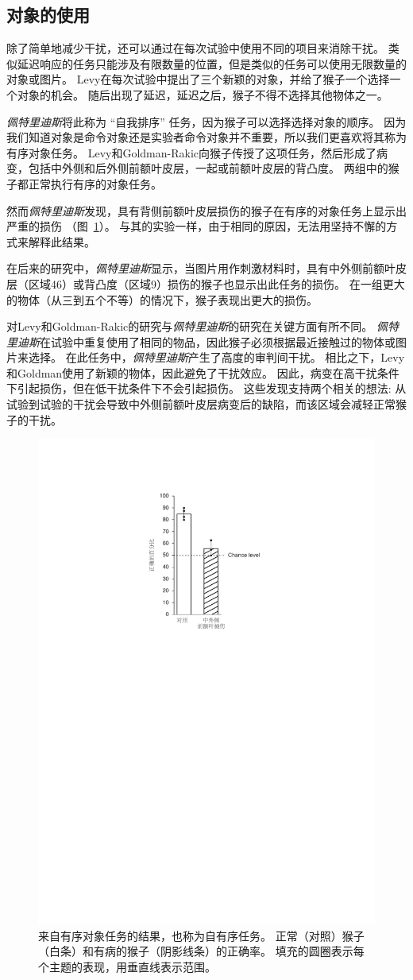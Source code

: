 \subsection{对象的使用}

除了简单地减少干扰，还可以通过在每次试验中使用不同的项目来消除干扰。
类似延迟响应的任务只能涉及有限数量的位置，但是类似的任务可以使用无限数量的对象或图片。
Levy\cite{levy1999association}在每次试验中提出了三个新颖的对象，并给了猴子一个选择一个对象的机会。
随后出现了延迟，延迟之后，猴子不得不选择其他物体之一。


\textit{佩特里迪斯}\cite{petrides1995impairments}将此称为 “自我排序” 任务，因为猴子可以选择选择对象的顺序。
因为我们知道对象是命令对象还是实验者命令对象并不重要，所以我们更喜欢将其称为有序对象任务。
Levy和Goldman-Rakic向猴子传授了这项任务，然后形成了病变，包括中外侧和后外侧前额叶皮层，一起或前额叶皮层的背凸度。
两组中的猴子都正常执行有序的对象任务。


然而\textit{佩特里迪斯}\cite{petrides1995impairments}发现，具有背侧前额叶皮层损伤的猴子在有序的对象任务上显示出严重的损伤 （图~\ref{fig:6_4}）。
与其的实验一样，由于相同的原因，无法用坚持不懈的方式来解释此结果。


在后来的研究中，\textit{佩特里迪斯}\cite{petrides2000dissociable}显示，当图片用作刺激材料时，具有中外侧前额叶皮层（区域46）或背凸度（区域9）损伤的猴子也显示出此任务的损伤。
在一组更大的物体（从三到五个不等）的情况下，猴子表现出更大的损伤。


对Levy和Goldman-Rakic的研究与\textit{佩特里迪斯}的研究在关键方面有所不同。
\textit{佩特里迪斯}在试验中重复使用了相同的物品，因此猴子必须根据最近接触过的物体或图片来选择。
在此任务中，\textit{佩特里迪斯}产生了高度的审判间干扰。
相比之下，Levy和Goldman使用了新颖的物体，因此避免了干扰效应。
因此，病变在高干扰条件下引起损伤，但在低干扰条件下不会引起损伤。
这些发现支持两个相关的想法: 从试验到试验的干扰会导致中外侧前额叶皮层病变后的缺陷，而该区域会减轻正常猴子的干扰。


\begin{figure}
	\centering
	\includegraphics[width=0.45\linewidth]{chap6/6_4}
	\caption{来自有序对象任务的结果，也称为自有序任务。
		正常（对照）猴子（白条）和有病的猴子（阴影线条）的正确率。
		填充的圆圈表示每个主题的表现，用垂直线表示范围\cite{petrides1995impairments}。}
	\label{fig:6_4}
\end{figure}




